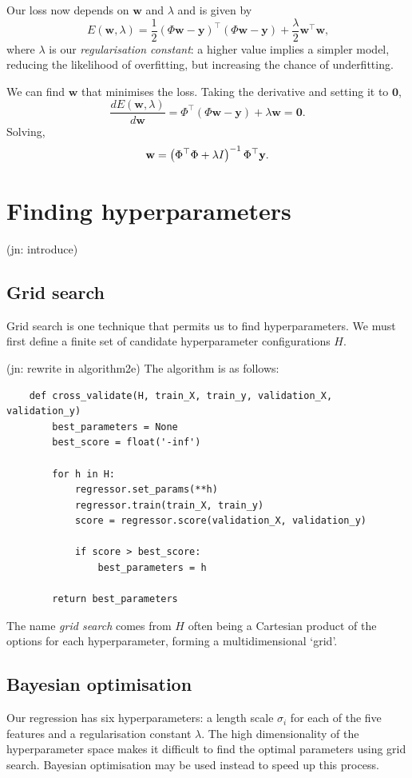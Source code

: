 \documentclass[11pt,twoside,openright]{report}
\newcommand\bw{\mathbf{w}}
\newcommand\by{\mathbf{y}}
\newcommand\jn[1]{{\color{red}(jn: #1)}}
\begin{document}
Our loss now depends on $\bw$ and $\lambda$ and is given by \[
    E(\bw, \lambda) = \frac12\left(\Phi \bw - \by\right)^\top\left(\Phi \bw - \by\right) + \frac{\lambda}{2}\bw^\top\bw \text{,}
\] where $\lambda$ is our \textit{regularisation constant}: a higher value implies a simpler model, reducing the likelihood of overfitting, but increasing the chance of underfitting.

We can find $\bw$ that minimises the loss. Taking the derivative and setting it to $\mathbf{0}$,\[
    \frac{dE(\bw, \lambda)}{d\bw} = \Phi^\top(\Phi\bw - \by) + \lambda \bw = \mathbf{0} \text{.}
\] Solving,\[
    \bw = \left(\Phi^\top\Phi + \lambda I\right)^{-1}\Phi^\top\by \text.
\]

\section{Finding hyperparameters}

\jn{introduce}

  \subsection{Grid search}

  Grid search is one technique that permits us to find hyperparameters. We must first define a finite set of candidate hyperparameter configurations $H$.

  \jn{rewrite in algorithm2e}
  The algorithm is as follows:
  \begin{verbatim}
    def cross_validate(H, train_X, train_y, validation_X, validation_y)
        best_parameters = None
        best_score = float('-inf')

        for h in H:
            regressor.set_params(**h)
            regressor.train(train_X, train_y)
            score = regressor.score(validation_X, validation_y)

            if score > best_score:
                best_parameters = h

        return best_parameters
  \end{verbatim}

  The name \emph{grid search} comes from $H$ often being a Cartesian product of the options for each hyperparameter, forming a multidimensional `grid'.

  \subsection{Bayesian optimisation}
  Our regression has six hyperparameters: a length scale $\sigma_i$ for each of the five features and a regularisation constant $\lambda$. The high dimensionality of the hyperparameter space makes it difficult to find the optimal parameters using grid search. Bayesian optimisation may be used instead to speed up this process.
\end{document}
